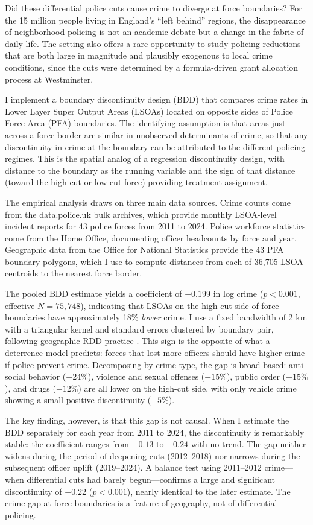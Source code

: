 \documentclass[12pt]{article}
\begin{document}
Did these differential police cuts cause crime to diverge at force boundaries? For the 15 million people living in England's ``left behind'' regions, the disappearance of neighborhood policing is not an academic debate but a change in the fabric of daily life. The setting also offers a rare opportunity to study policing reductions that are both large in magnitude and plausibly exogenous to local crime conditions, since the cuts were determined by a formula-driven grant allocation process at Westminster.

I implement a boundary discontinuity design (BDD) that compares crime rates in Lower Layer Super Output Areas (LSOAs) located on opposite sides of Police Force Area (PFA) boundaries. The identifying assumption is that areas just across a force border are similar in unobserved determinants of crime, so that any discontinuity in crime at the boundary can be attributed to the different policing regimes. This is the spatial analog of a regression discontinuity design, with distance to the boundary as the running variable and the sign of that distance (toward the high-cut or low-cut force) providing treatment assignment.

The empirical analysis draws on three main data sources. Crime counts come from the data.police.uk bulk archives, which provide monthly LSOA-level incident reports for 43 police forces from 2011 to 2024. Police workforce statistics come from the Home Office, documenting officer headcounts by force and year. Geographic data from the Office for National Statistics provide the 43 PFA boundary polygons, which I use to compute distances from each of 36,705 LSOA centroids to the nearest force border.

The pooled BDD estimate yields a coefficient of $-0.199$ in log crime ($p < 0.001$, effective $N = 75{,}748$), indicating that LSOAs on the high-cut side of force boundaries have approximately 18\% \textit{lower} crime. I use a fixed bandwidth of 2 km with a triangular kernel and standard errors clustered by boundary pair, following geographic RDD practice \citep{keele2015}. This sign is the opposite of what a deterrence model predicts: forces that lost more officers should have higher crime if police prevent crime. Decomposing by crime type, the gap is broad-based: anti-social behavior ($-24\%$), violence and sexual offenses ($-15\%$), public order ($-15\%$), and drugs ($-12\%$) are all lower on the high-cut side, with only vehicle crime showing a small positive discontinuity ($+5\%$).

The key finding, however, is that this gap is not causal. When I estimate the BDD separately for each year from 2011 to 2024, the discontinuity is remarkably stable: the coefficient ranges from $-0.13$ to $-0.24$ with no trend. The gap neither widens during the period of deepening cuts (2012--2018) nor narrows during the subsequent officer uplift (2019--2024). A balance test using 2011--2012 crime---when differential cuts had barely begun---confirms a large and significant discontinuity of $-0.22$ ($p < 0.001$), nearly identical to the later estimate. The crime gap at force boundaries is a feature of geography, not of differential policing.
\end{document}
